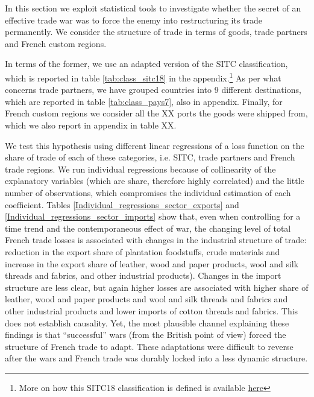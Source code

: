 \documentclass[12pt,a4paper,notitlepage,english]{article}
\begin{document}

In this section we exploit statistical tools to investigate whether the secret of an effective trade war was to force the enemy into restructuring its trade permanently. 
We consider the structure of trade in terms of goods, trade partners and French custom regions. 

In terms of the former, we use an adapted version of the SITC classification, which is reported in table \ref{tab:class_sitc18} in the appendix.\footnote{More on how this SITC18 classification is defined is available \href{http://toflit18.medialab.sciences-po.fr/\#/home}{here}} As per what concerns trade partners, we have grouped countries into 9 different destinations, which are reported in table \ref{tab:class_pays7}, also in appendix. Finally, for French custom regions we consider all the XX ports the goods were shipped from, which we also report in appendix in table XX. 

We test this hypothesis using different linear regressions of a loss function on the share of trade of each of these categories, i.e. SITC, trade partners and French trade regions.
We run individual regressions because of collinearity of the explanatory variables (which are share, therefore highly correlated) and the little number of observations, which compromises the individual estimation of each coefficient.
Tables \ref{Individual_regressions_sector_exports} and \ref{Individual_regressions_sector_imports} show that, even when controlling for a time trend and the contemporaneous effect of war, the changing level of total French trade losses is associated with changes in the industrial structure of trade: reduction in the export share of plantation foodstuffs, crude materials and increase in the export share of leather, wood and paper products, wool and silk threads and fabrics, and other industrial products).
Changes in the import structure are less clear, but again higher losses are associated with higher share of leather, wood and paper products and wool and silk threads and fabrics and other industrial products and lower imports of cotton threads and fabrics.
This does not establish causality. Yet, the most plausible channel explaining these findings is that ``successful'' wars (from the British point of view) forced the structure of French trade to adapt.
These adaptations were difficult to reverse after the wars and French trade was durably locked into a less dynamic structure.
\end{document}
